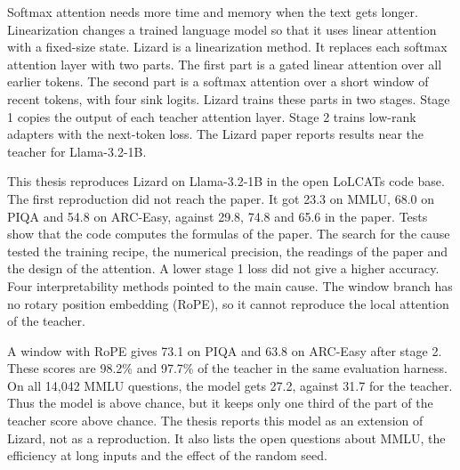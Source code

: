 \cleardoubleoddpage
\begin{abstract*}
Softmax attention needs more time and memory when the text gets longer. Linearization changes a trained language model so that it uses linear attention with a fixed-size state. Lizard is a linearization method. It replaces each softmax attention layer with two parts. The first part is a gated linear attention over all earlier tokens. The second part is a softmax attention over a short window of recent tokens, with four sink logits. Lizard trains these parts in two stages. Stage 1 copies the output of each teacher attention layer. Stage 2 trains low-rank adapters with the next-token loss. The Lizard paper reports results near the teacher for Llama-3.2-1B.

This thesis reproduces Lizard on Llama-3.2-1B in the open LoLCATs code base. The first reproduction did not reach the paper. It got 23.3 on MMLU, 68.0 on PIQA and 54.8 on ARC-Easy, against 29.8, 74.8 and 65.6 in the paper. Tests show that the code computes the formulas of the paper. The search for the cause tested the training recipe, the numerical precision, the readings of the paper and the design of the attention. A lower stage 1 loss did not give a higher accuracy. Four interpretability methods pointed to the main cause. The window branch has no rotary position embedding (RoPE), so it cannot reproduce the local attention of the teacher.

A window with RoPE gives 73.1 on PIQA and 63.8 on ARC-Easy after stage 2. These scores are 98.2\% and 97.7\% of the teacher in the same evaluation harness. On all 14,042 MMLU questions, the model gets 27.2, against 31.7 for the teacher. Thus the model is above chance, but it keeps only one third of the part of the teacher score above chance. The thesis reports this model as an extension of Lizard, not as a reproduction. It also lists the open questions about MMLU, the efficiency at long inputs and the effect of the random seed.

\end{abstract*}

\cleardoubleoddpage
\begin{otherlanguage}{ngerman}
\begin{abstract*}
\end{abstract*}
\end{otherlanguage}
